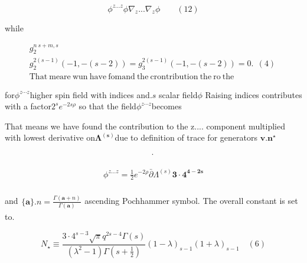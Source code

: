 \documentclass{article}
\begin{document}
\begin{equation}
\phi ^ { z... z } \phi \nabla _ { z }... \nabla _ { z } \phi \qquad ( 1 2 )
\end{equation}


while


\begin{equation}
\begin{array} { l } { g _ { 2 } ^ { n ~ s + m, s } } \\ { g _ { 2 } ^ { 2 ( s - 1 ) } ( - 1, - ( s - 2 ) ) = g _ { 3 } ^ { 2 ( s - 1 ) } ( - 1, - ( s - 2 ) ) = 0. ~ \mathrm { ~ ( 4 ) ~ } } \\ { \mathrm { T h a t ~ m e a r e ~ w u n ~ h a v e ~ f o m a n d ~ t h e ~ c r o n t r i b u t i o n ~ t h e ~ r o ~ t h e ~ } \quad}\end{array}
\end{equation}


for$\phi ^ { z \cdots z }$higher spin field with indices and$. { s }$  scalar field$\phi$
Raising indices contributes with a factor$2 ^ { s } e ^ { - 2 s \rho }$ so that
the field$\phi ^ { z \cdots z }$becomes


That means we have found the contribution to the z....
component multiplied with lowest derivative on$\mathbf { \Lambda } ^ { ( \pmb { s } ) }$due
to definition of trace for generators $\boldsymbol { v } . { \mathbf { n } } ^ { \star }$


\begin{equation}
\begin{array} { c } { \cdot ~ }\end{array}
\end{equation}


\begin{equation}
\begin{array} { l } { \phi ^ { z \dots z } = \frac { 1 } { 2 } e ^ { - 2 \rho } \bar { \partial } \Lambda ^ { ( s ) } \mathbf { 3 \cdot 4 ^ { 4 - 2 s } } } \\ { ~ }\end{array}
\end{equation}


and$\begin{array} { r } { \{ \mathbf { a } \} . { n } = \frac { \Gamma ( \mathbf { a } + n ) } { \Gamma ( \mathbf { a } ) } } \end{array}$ascending Pochhammer symbol. The
overall constant is set to.


\begin{equation}
N _ { \star } \equiv \frac { 3 \cdot 4 ^ { s - 3 } \sqrt { \pi } q ^ { 2 s - 4 } \Gamma ( s ) } { ( \lambda ^ { 2 } - 1 ) \Gamma ( s + \frac { 1 } { 2 } ) } ( 1 - \lambda ) _ { s - 1 } ( 1 + \lambda ) _ { s - 1 } \quad ( 6 )
\end{equation}
\end{document}
